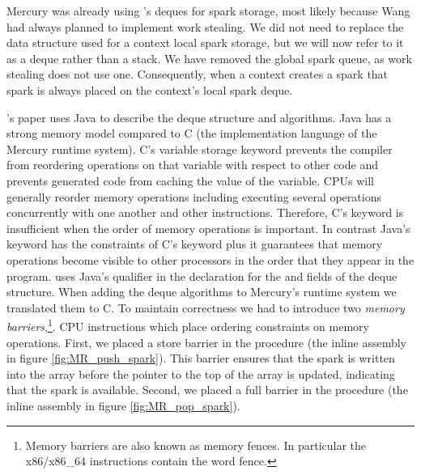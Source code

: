 Mercury was already using \citet{Chase_2005_wsdeque}'s deques for spark
storage,
most likely because Wang had always planned to implement work stealing.
We did not need to replace the data structure used for a context local
spark storage,
but we will now refer to it as a deque rather than a stack.
We have removed the global spark queue,
as work stealing does not use one.
Consequently,
when a context creates a spark that spark is always placed on the
context's local spark deque.

\citet{Chase_2005_wsdeque}'s paper uses Java to describe the deque structure
and algorithms.
Java has a strong memory model compared to C (the implementation language of
the Mercury runtime system).
C's  variable storage keyword prevents the compiler from
reordering operations on that variable with respect to other code and
prevents generated code from caching the value of the variable.
CPUs will generally reorder memory operations including executing
several operations concurrently with one another and other instructions.
Therefore, C's  keyword is insufficient when the order of
memory operations is important.
In contrast
Java's  keyword has the constraints of C's keyword
plus it guarantees that memory operations become visible to other
processors in the order that they appear in the program.
\citet{Chase_2005_wsdeque} uses Java's  qualifier in the
declaration for the  and  fields of the deque
structure.
When adding the deque algorithms to Mercury's runtime system we translated
them to C.
To maintain correctness we had to introduce two \emph{memory barriers},\footnote{
    Memory barriers are also known as memory fences.
    In particular the x86/x86\_64 instructions contain the word fence.}.
CPU instructions which place ordering constraints on memory operations.
First, we placed a store barrier in the \push procedure
(the inline assembly in figure \ref{fig:MR_push_spark}).
This barrier ensures that the spark is written into the array before the pointer to
the top of the array is updated,
indicating that the spark is available.
Second, we placed a full barrier in the \pop procedure
(the inline assembly in figure \ref{fig:MR_pop_spark}).
